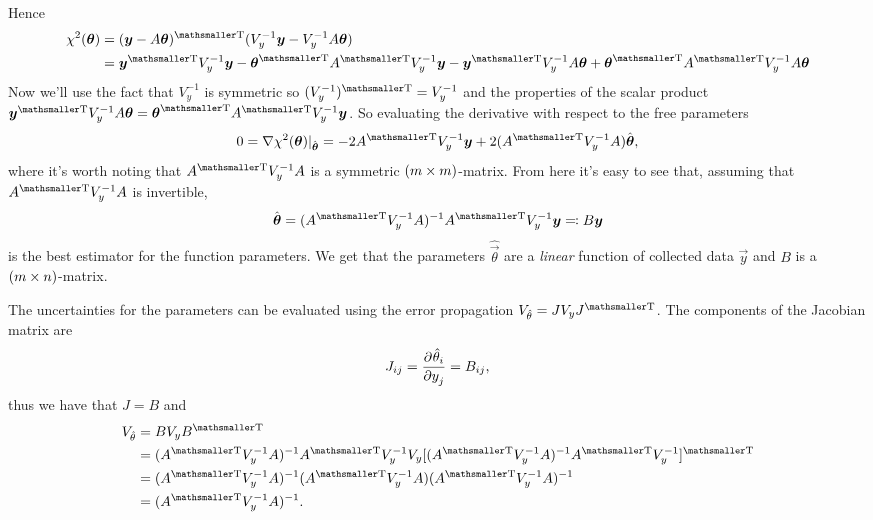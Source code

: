 Hence
\begin{equation}
	\begin{aligned}
		\chi^2(\vec{\theta})
		&= \transpose{(\vec{y} - A\vec{\theta})}(V_y^{-1}\vec{y} -V_y^{-1}A\vec{\theta}) \\
  &= \transpose{\vec{y}}V_y^{-1}\vec{y} - \transpose{\vec{\theta}}\transpose{A}V_y^{-1}\vec{y}
		-\transpose{\vec{y}}V_y^{-1}A\vec{\theta} + \transpose{\vec{\theta}}\transpose{A} V_y^{-1} A\vec{\theta}
	\end{aligned}
\end{equation}
Now we'll use the fact that $V_y^{-1}$ is symmetric so $\transpose{(V_y^{-1})}=V_y^{-1}$ and the properties of the scalar product $\transpose{\vec{y}}V_y^{-1}A\vec{\theta} = \transpose{\vec{\theta}}\transpose{A}V_y^{-1}\vec{y}$.
So evaluating the derivative with respect to the free parameters
\begin{equation}
	0 = \V \chi^2(\vec{\theta})\rvert_{\hat{\vec{\theta}}} = -2 \transpose{A}V_y^{-1} \vec{y} + 2 (\transpose{A}V_y^{-1}A)\hat{\vec{\theta}},
\end{equation}
where it's worth noting that $\transpose{A}V_y^{-1}A$ is a symmetric $(m\times m)$-matrix.
From here it's easy to see that, assuming that $\transpose{A}V_y^{-1}A$ is invertible,
\begin{equation}
	\hat{\vec{\theta}} = (\transpose{A}V_y^{-1}A)^{-1} \transpose{A}V_y^{-1}\vec{y}
	\eqqcolon B\vec{y}
\end{equation}
is the best estimator for the function parameters.
We get that the parameters $\hat{\vec{\theta}}$ are a \emph{linear} function of collected data $\vec{y}$ and $B$ is a $(m\times n)$-matrix.


The uncertainties for the parameters can be evaluated using the error propagation $V_{\hat{\theta}} = J V_y\transpose{J}$.
The components of the Jacobian matrix are
\begin{equation}
	J_{ij} = \dfrac{{\mathop{}\!\mathrm{\partial}^{}}\hat{\theta}_i}{\mathop{}\!\mathrm{\partial} y_j^{}} = B_{ij},
\end{equation}
thus we have that $J=B$ and
\begin{equation}
	\begin{aligned}
		V_{\hat{\theta}}
		&= B V_y\transpose{B}\\
  &= (\transpose{A}V_y^{-1}A)^{-1} \transpose{A}V_y^{-1}V_y\transpose{[(\transpose{A}V_y^{-1}A)^{-1} \transpose{A}V_y^{-1}]}\\
  &= (\transpose{A}V_y^{-1}A)^{-1} (\transpose{A}V_y^{-1}A) (\transpose{A}V_y^{-1}A)^{-1} \\
  &= (\transpose{A}V_y^{-1}A)^{-1}.
	\end{aligned}
\end{equation}


